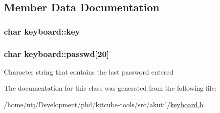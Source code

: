 \subsection{Member Data Documentation}
\hypertarget{classkeyboard_aa38f064c4a946810840ec389c4df81d6}{
\subsubsection[{key}]{\setlength{\rightskip}{0pt plus 5cm}char keyboard\-::key\hspace{0.3cm}{\ttfamily [private]}}}\label{classkeyboard_aa38f064c4a946810840ec389c4df81d6}
\hypertarget{classkeyboard_aacee1ab06d08c89eae28515ac52d4333}{
\subsubsection[{passwd}]{\setlength{\rightskip}{0pt plus 5cm}char keyboard\-::passwd\mbox{[}20\mbox{]}}}\label{classkeyboard_aacee1ab06d08c89eae28515ac52d4333}
Character string that contains the last password entered 

The documentation for this class was generated from the following file\-:\begin{DoxyCompactItemize}
\item 
/home/ntj/\-Development/phd/kitcube-\/tools/src/akutil/\hyperlink{keyboard_8h}{keyboard.\-h}\end{DoxyCompactItemize}
